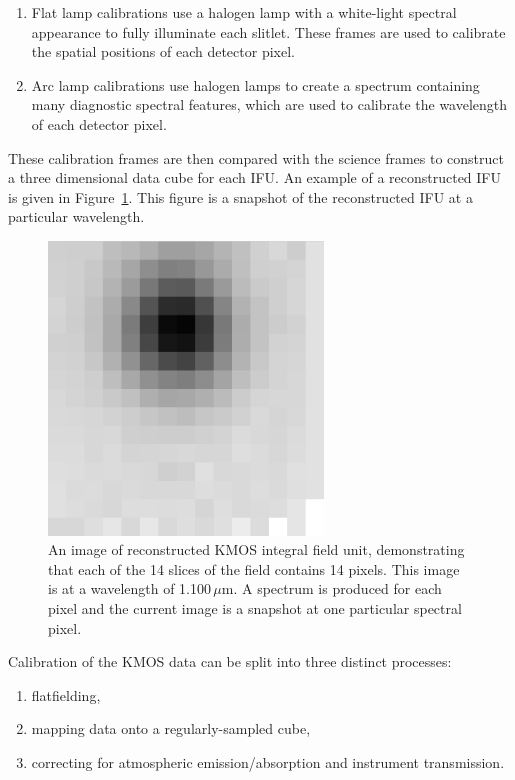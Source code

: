 \begin{enumerate}
    \item Flat lamp calibrations use a halogen lamp with a white-light spectral appearance to fully illuminate each slitlet.
    These frames are used to calibrate the spatial positions of each detector pixel.

    \item Arc lamp calibrations use halogen lamps to create a spectrum containing many diagnostic spectral features, which are used to calibrate the wavelength of each detector pixel.
\end{enumerate}

These calibration frames are then compared with the science frames to construct a three dimensional data cube for each IFU.
An example of a reconstructed IFU is given in Figure~\ref{fig:kmosIFU}.
This figure is a snapshot of the reconstructed IFU at a particular wavelength.

\begin{figure}
 \centering
 \includegraphics[width=0.65\textwidth]{kmos/ngc2100-ifu}
 \caption[An example of a reconstructed KMOS integral field unit]{An image of reconstructed KMOS integral field unit, demonstrating that each of the 14 slices of the field contains 14 pixels.
 This image is at a wavelength of 1.100\,$\mu$m.
 A spectrum is produced for each pixel and the current image is a snapshot at one particular spectral pixel.
 \label{fig:kmosIFU}}
\end{figure}

Calibration of the KMOS data can be split into three distinct processes:

\begin{enumerate}
    \item flatfielding,
    \item mapping data onto a regularly-sampled cube,
    \item correcting for atmospheric emission/absorption and instrument transmission.
\end{enumerate}


